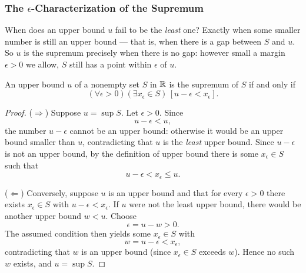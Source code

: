 \subsubsection{The \texorpdfstring{$\epsilon$}{Epsilon}-Characterization of the Supremum}
When does an upper bound $u$ fail to be the \emph{least} one? Exactly when some smaller number is still an upper bound --- that is, when there is a gap between $S$ and $u$. So $u$ is the supremum precisely when there is no gap: however small a margin $\epsilon>0$ we allow, $S$ still has a point within $\epsilon$ of $u$.


\begin{lemma}\label{lem:eps-characterization}
    An upper bound $u$ of a nonempty set $S$ in $\mathbb{R}$ is the supremum of $S$ if and only if
    \begin{equation*}
        (\forall \epsilon > 0)(\exists x_\epsilon \in S)\,[u - \epsilon < x_\epsilon].
    \end{equation*}
\end{lemma}

\begin{proof}
    ($\Rightarrow$) Suppose $u=\sup S$. Let $\epsilon>0$. Since
    \begin{equation*}
        u-\epsilon<u,
    \end{equation*}
    the number $u-\epsilon$ cannot be an upper bound: otherwise it would be an upper bound smaller than $u$, contradicting that $u$ is the \emph{least} upper bound. Since $u - \epsilon$ is not an upper bound, by the definition of upper bound there is some $x_\epsilon\in S$ such that
    \begin{equation*}
        u-\epsilon<x_\epsilon\leq u.
    \end{equation*}

    ($\Leftarrow$) Conversely, suppose $u$ is an upper bound and that for every $\epsilon>0$ there exists $x_\epsilon\in S$ with $u-\epsilon<x_\epsilon$. If $u$ were not the least upper bound, there would be another upper bound $w<u$. Choose
    \begin{equation*}
        \epsilon=u-w>0.
    \end{equation*}
    The assumed condition then yields some $x_\epsilon \in S$ with
    \begin{equation*}
        w=u-\epsilon<x_\epsilon,
    \end{equation*}
    contradicting that $w$ is an upper bound (since $x_\epsilon \in S$ exceeds $w$). Hence no such $w$ exists, and $u=\sup S$.
\end{proof}


